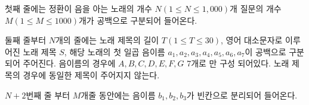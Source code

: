 첫째 줄에는 정환이 음을 아는 노래의 개수 $N(1 ≤ N ≤ 1,000)$개 질문의 개수 $M(1 ≤ M ≤ 1000)$개가 공백으로 구분되어 들어온다.

둘째 줄부터 $N$개의 줄에는 노래 제목의 길이 $T(1 ≤ T ≤ 30)$, 영어 대소문자로 이루어진 노래 제목 $S$, 해당 노래의 첫 일곱 음이름 $a_1, a_2, a_3, a_4, a_5, a_6, a_7$이 공백으로 구분되어 주어진다. 음이름의 경우에 $A, B, C, D, E, F, G$ 7개로 만 구성 되어있다. 노래 제목의 경우에 동일한 제목이 주어지지 않는다.

$N+2$번째 줄 부터 $M$개줄 동안에는 음이름 $b_1, b_2, b_3$가 빈칸으로 분리되어 들어온다.
